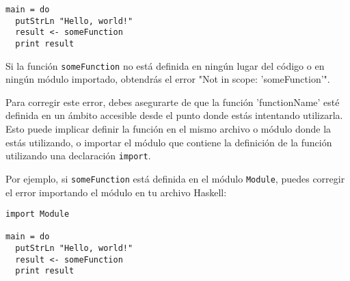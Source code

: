 \documentclass{article}
\begin{document}
\begin{verbatim}
main = do
  putStrLn "Hello, world!"
  result <- someFunction
  print result
\end{verbatim}

Si la función \texttt{someFunction} no está definida en ningún lugar del código o en ningún módulo importado, obtendrás el error "Not in scope: 'someFunction'".

Para corregir este error, debes asegurarte de que la función 'functionName' esté definida en un ámbito accesible desde el punto donde estás intentando utilizarla. Esto puede implicar definir la función en el mismo archivo o módulo donde la estás utilizando, o importar el módulo que contiene la definición de la función utilizando una declaración \texttt{import}.

Por ejemplo, si \texttt{someFunction} está definida en el módulo \texttt{Module}, puedes corregir el error importando el módulo en tu archivo Haskell:

\begin{verbatim}
import Module

main = do
  putStrLn "Hello, world!"
  result <- someFunction
  print result
\end{verbatim}
\end{document}
